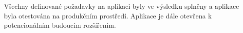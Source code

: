 Všechny definované požadavky na aplikaci byly ve výsledku splněny a aplikace byla otestována na produkčním prostředí.
Aplikace je dále otevřena k potencionálním budoucím rozšířením.

